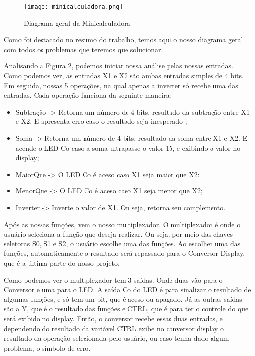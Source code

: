 \documentclass[
	12pt,				%
	openright,			%
	oneside,			%
	a4paper,			%
	brazil,				%
	]{abntex2}
\begin{document}
    \begin{figure}[h!]
    \centering
    \texttt{[image: minicalculadora.png]}
    \caption{Diagrama geral da Minicalculadora}
    \end{figure}

Como foi destacado no resumo do trabalho, temos aqui o nosso diagrama geral com todos os problemas que teremos que solucionar. 

Analisando a Figura 2, podemos iniciar nossa análise pelas nossas entradas. Como podemos ver, as entradas X1 e X2 são ambas entradas simples de 4 bits. Em seguida, nossas 5 operações, na qual apenas a inverter só recebe uma das entradas. Cada operação funciona da seguinte maneira: 

\begin{itemize}

        \item Subtração -> Retorna um número de 4 bits, resultado da subtração entre X1 e X2. E apresenta erro caso o resultado seja inesperado ;
        \item Soma -> Retorna um número de 4 bits, resultado da soma entre X1 e X2. E acende o LED Co caso a soma ultrapasse o valor 15, e exibindo o valor no display;
        \item MaiorQue -> O LED Co é aceso caso X1 seja maior que X2; 
        \item MenorQue -> O LED Co é aceso caso X1 seja menor que X2;
        \item Inverter -> Inverte o valor de X1. Ou seja, retorna seu complemento. 
        
\end{itemize}

Após as nossas funções, vem o nosso multiplexador. O multiplexador é onde o usuário seleciona a função que deseja realizar. Ou seja, por meio das chaves seletoras S0, S1 e S2, o usuário escolhe uma das funções. Ao escolher uma das funções, automaticamente o resultado será repassado para o Conversor Display, que é a última parte do nosso projeto.

Como podemos ver o multiplexador tem 3 saídas. Onde duas vão para o Conversor e uma para o LED. A saída Co do LED é para sinalizar o resultado de algumas funções, e só tem um bit, que é aceso ou apagado. Já as outras saídas são a Y, que é o resultado das funções e CTRL, que é para ter o controle do que será exibido no display. Então, o conversor recebe essas duas entradas, e dependendo do resultado da variável CTRL exibe no conversor display o resultado da operação selecionada pelo usuário, ou caso tenha dado algum problema, o símbolo de erro. 
\end{document}
